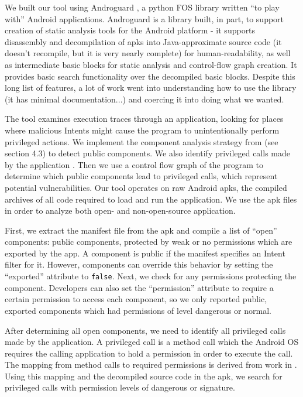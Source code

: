 \documentclass[12pt,a4paper]{article}
\begin{document}
We built our tool using Androguard \cite{androguard}, a python FOS library
written ``to play with'' Android applications. Androguard is a library built, in
part, to support creation of static analysis tools for the Android platform - it
supports disassembly and decompilation of apks into Java-approximate source code
(it doesn't recompile, but it is very nearly complete) for human-readability, as
well as intermediate basic blocks for static analysis and control-flow graph
creation. It provides basic search functionality over the decompiled basic
blocks. Despite this long list of features, a lot of work went into
understanding how to use the library (it has minimal documentation...) and
coercing it into doing what we wanted.

The tool examines execution traces through an application, looking for places
where malicious Intents might cause the program to unintentionally perform
privileged actions. We implement the component analysis strategy from
\cite{chin_analyzing_2011} (see section 4.3) to detect public components. We
also identify privileged calls made by the application
\cite{felt_android_2011}. Then we use a control flow graph of the program to
determine which public components lead to privileged calls, which represent
potential vulnerabilities. Our tool operates on raw Android apks, the compiled
archives of all code required to load and run the application. We use the apk
files in order to analyze both open- and non-open-source application.

First, we extract the manifest file from the apk and compile a list of ``open''
components: public components, protected by weak or no permissions which are
exported by the app. A component is public if the manifest specifies an Intent
filter for it. However, components can override this behavior by setting the
``exported'' attribute to \texttt{false}. Next, we check for any permissions
protecting the component. Developers can also set the ``permission'' attribute
to require a certain permission to access each component, so we only reported
public, exported components which had permissions of level dangerous or normal.

After determining all open components, we need to identify all privileged calls
made by the application. A privileged call is a method call which the Android OS
requires the calling application to hold a permission in order to execute
the call. The mapping from method calls to required permissions is
derived from work in \cite{felt_android_2011}. Using this mapping and the
decompiled source code in the apk, we search for privileged calls with
permission levels of dangerous or signature.
\end{document}
